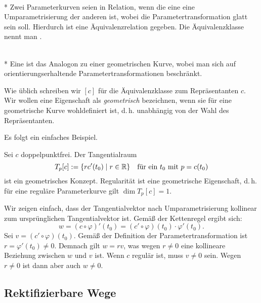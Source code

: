 \begin{definition}\mbox{}\\*
Zwei Parameterkurven seien in Relation, wenn die eine eine
Umparametrisierung der anderen ist, wobei die Parametertransformation
glatt sein soll. Hierdurch ist eine 
Äquivalenzrelation gegeben. Die Äquivalenzklasse nennt man
.
\end{definition}

\begin{definition}\mbox{}\\*
Eine  ist das Analogon zu einer
geometrischen Kurve, wobei man sich auf orientierungserhaltende
Parametertransformationen beschränkt.
\end{definition}

\noindent
Wie üblich schreiben wir $[c]$ für die Äquivalenzklasse zum
Repräsentanten $c$. Wir wollen eine Eigenschaft als
\emph{geometrisch} bezeichnen, wenn sie für eine geometrische Kurve
wohldefiniert ist, d.\,h. unabhängig von der Wahl des Repräsentanten.

Es folgt ein einfaches Beispiel.

\begin{corollary}
Sei $c$ doppelpunktfrei. Der Tangentialraum
\begin{equation}
T_p[c] := \{rc'(t_0)\mid r\in\mathbb R\}
\quad\text{für ein $t_0$ mit $p=c(t_0)$}
\end{equation}
ist ein geometrisches Konzept. Regularität ist eine geometrische
Eigenschaft, d.\,h. für eine reguläre Parameterkurve gilt
$\dim T_p[c]=1$.
\end{corollary}

\noindent{}
Wir zeigen einfach, dass der Tangentialvektor nach Umparametrisierung
kollinear zum ursprünglichen Tangentialvektor ist. Gemäß der
Kettenregel ergibt sich:%
\begin{equation}
w = (c\circ\varphi)'(t_0) = (c'\circ\varphi)(t_0)\cdot \varphi'(t_0).
\end{equation}
Sei $v=(c'\circ\varphi)(t_0)$. Gemäß der Definition der
Parametertransformation ist $r=\varphi'(t_0)\ne 0$. Demnach
gilt $w=rv$, was wegen $r\ne 0$ eine kollineare Beziehung zwischen
$w$ und $v$ ist. Wenn $c$ regulär ist, muss $v\ne 0$ sein.
Wegen $r\ne 0$ ist dann aber auch $w\ne 0$.\;\qedsymbol


\subsection{Rektifizierbare Wege}


